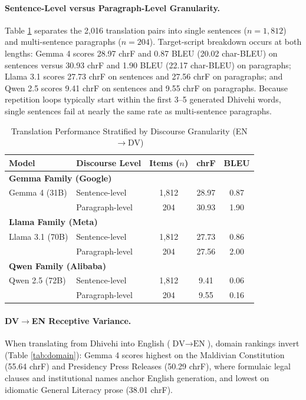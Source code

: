\documentclass[acmsmall,review,anonymous]{acmart}
\begin{document}
\paragraph{Sentence-Level versus Paragraph-Level Granularity.}
Table \ref{tab:granularity} separates the 2,016 translation pairs into single sentences ($n=1,812$) and multi-sentence paragraphs ($n=204$). Target-script breakdown occurs at both lengths: Gemma 4 scores 28.97 chrF and 0.87 BLEU (20.02 char-BLEU) on sentences versus 30.93 chrF and 1.90 BLEU (22.17 char-BLEU) on paragraphs; Llama 3.1 scores 27.73 chrF on sentences and 27.56 chrF on paragraphs; and Qwen 2.5 scores 9.41 chrF on sentences and 9.55 chrF on paragraphs. Because repetition loops typically start within the first 3--5 generated Dhivehi words, single sentences fail at nearly the same rate as multi-sentence paragraphs.

\begin{table}[t]
\centering
\caption{Translation Performance Stratified by Discourse Granularity (EN$\rightarrow$DV)}
\label{tab:granularity}
\begin{tabular}{llccc}
\toprule
\textbf{Model} & \textbf{Discourse Level} & \textbf{Items ($n$)} & \textbf{chrF} & \textbf{BLEU} \\
\midrule
\multicolumn{5}{l}{\textbf{Gemma Family (Google)}} \\
\quad Gemma 4 (31B) & Sentence-level & 1,812 & 28.97 & 0.87 \\
                    & Paragraph-level & 204 & 30.93 & 1.90 \\
\midrule
\multicolumn{5}{l}{\textbf{Llama Family (Meta)}} \\
\quad Llama 3.1 (70B) & Sentence-level & 1,812 & 27.73 & 0.86 \\
                      & Paragraph-level & 204 & 27.56 & 2.00 \\
\midrule
\multicolumn{5}{l}{\textbf{Qwen Family (Alibaba)}} \\
\quad Qwen 2.5 (72B) & Sentence-level & 1,812 & 9.41 & 0.06 \\
                     & Paragraph-level & 204 & 9.55 & 0.16 \\
\bottomrule
\end{tabular}
\end{table}

\paragraph{DV$\rightarrow$EN Receptive Variance.}
When translating from Dhivehi into English ($\text{DV}\rightarrow\text{EN}$), domain rankings invert (Table \ref{tab:domain}): Gemma 4 scores highest on the Maldivian Constitution (55.64 chrF) and Presidency Press Releases (50.29 chrF), where formulaic legal clauses and institutional names anchor English generation, and lowest on idiomatic General Literacy prose (38.01 chrF).
\end{document}
